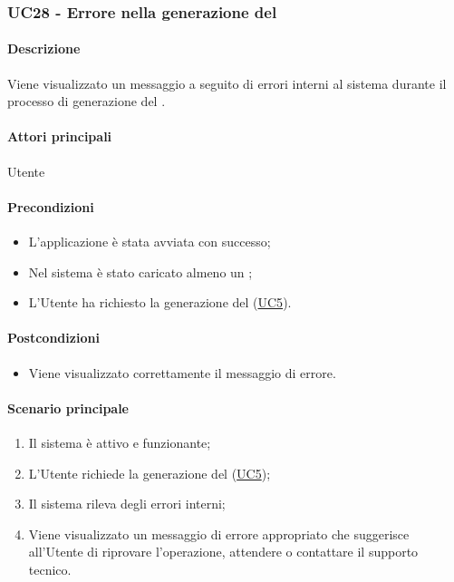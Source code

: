 \subsubsection{UC28 - Errore nella generazione del }\label{UC28}
\paragraph*{Descrizione}
Viene visualizzato un messaggio a seguito di errori interni al sistema durante il processo di generazione del .

\paragraph*{Attori principali}
Utente

\paragraph*{Precondizioni}
\begin{itemize}
  \item L'applicazione è stata avviata con successo;
  \item Nel sistema è stato caricato almeno un ;
  \item L'Utente ha richiesto la generazione del  (\hyperref[UC5]{UC5}).  
\end{itemize}

\paragraph*{Postcondizioni}
\begin{itemize}
  \item Viene visualizzato correttamente il messaggio di errore.
\end{itemize}

\paragraph*{Scenario principale}
\begin{enumerate}
  \item Il sistema è attivo e funzionante;
  \item L'Utente richiede la generazione del  (\hyperref[UC5]{UC5});
  \item Il sistema rileva degli errori interni;
  \item Viene visualizzato un messaggio di errore appropriato che suggerisce all'Utente di riprovare l'operazione, attendere o contattare il supporto tecnico.
\end{enumerate}
